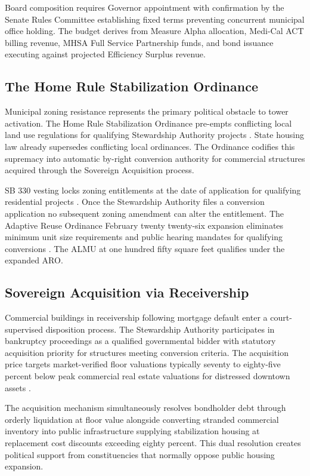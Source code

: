 \documentclass[12pt, letterpaper]{article}
\begin{document}
Board composition requires Governor appointment with confirmation by the Senate Rules Committee establishing fixed terms preventing concurrent municipal office holding. The budget derives from Measure Alpha allocation, Medi-Cal ACT billing revenue, MHSA Full Service Partnership funds, and bond issuance executing against projected Efficiency Surplus revenue.

\subsection{The Home Rule Stabilization Ordinance}

Municipal zoning resistance represents the primary political obstacle to tower activation. The Home Rule Stabilization Ordinance pre-empts conflicting local land use regulations for qualifying Stewardship Authority projects \citep{holland_knight_2025}. State housing law already supersedes conflicting local ordinances. The Ordinance codifies this supremacy into automatic by-right conversion authority for commercial structures acquired through the Sovereign Acquisition process.

SB 330 vesting locks zoning entitlements at the date of application for qualifying residential projects \citep{la_planning_sb330_2026}. Once the Stewardship Authority files a conversion application no subsequent zoning amendment can alter the entitlement. The Adaptive Reuse Ordinance February twenty twenty-six expansion eliminates minimum unit size requirements and public hearing mandates for qualifying conversions \citep{la_planning_aro_2026}. The ALMU at one hundred fifty square feet qualifies under the expanded ARO.

\subsection{Sovereign Acquisition via Receivership}

Commercial buildings in receivership following mortgage default enter a court-supervised disposition process. The Stewardship Authority participates in bankruptcy proceedings as a qualified governmental bidder with statutory acquisition priority for structures meeting conversion criteria. The acquisition price targets market-verified floor valuations typically seventy to eighty-five percent below peak commercial real estate valuations for distressed downtown assets \citep{globest_2025}.

The acquisition mechanism simultaneously resolves bondholder debt through orderly liquidation at floor value alongside converting stranded commercial inventory into public infrastructure supplying stabilization housing at replacement cost discounts exceeding eighty percent. This dual resolution creates political support from constituencies that normally oppose public housing expansion.
\end{document}
